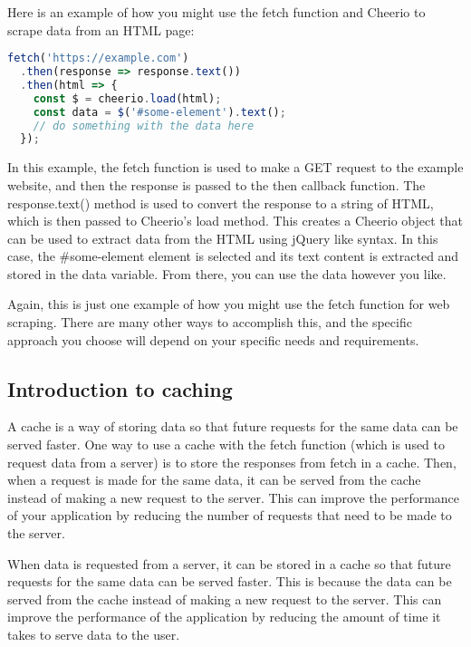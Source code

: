 {Here is an example of how you might use the fetch function and Cheerio to scrape data from an HTML page:

\begin{lstlisting}[language=Javascript, caption=Grabbing raw html with fetch and feeding that into a library]
fetch('https://example.com')
  .then(response => response.text())
  .then(html => {
    const $ = cheerio.load(html);
    const data = $('#some-element').text();
    // do something with the data here
  });

\end{lstlisting}

In this example, the fetch function is used to make a GET request to the example website,
and then the response is passed to the then callback function. The response.text() method is used to convert the response to a string of HTML, which is then passed to Cheerio's load method. This creates a Cheerio object that can be used to extract data from the HTML using jQuery like syntax. In this case, the \#some-element element is selected and its text content is extracted and stored in the data variable. From there, you can use the data however you like.

Again, this is just one example of how you might use the fetch function for web scraping. There are many other ways to accomplish this, and the specific approach you choose will depend on your specific needs and requirements.

\subsection{Introduction to caching}
A cache is a way of storing data so that future requests for the same data can be served faster. One way to use a cache with the fetch function (which is used to request data from a server) is to store the responses from fetch in a cache. Then, when a request is made for the same data, it can be served from the cache instead of making a new request to the server. This can improve the performance of your application by reducing the number of requests that need to be made to the server.

When data is requested from a server, it can be stored in a cache so that future requests for the same data can be served faster. This is because the data can be served from the cache instead of making a new request to the server. This can improve the performance of the application by reducing the amount of time it takes to serve data to the user.

}
